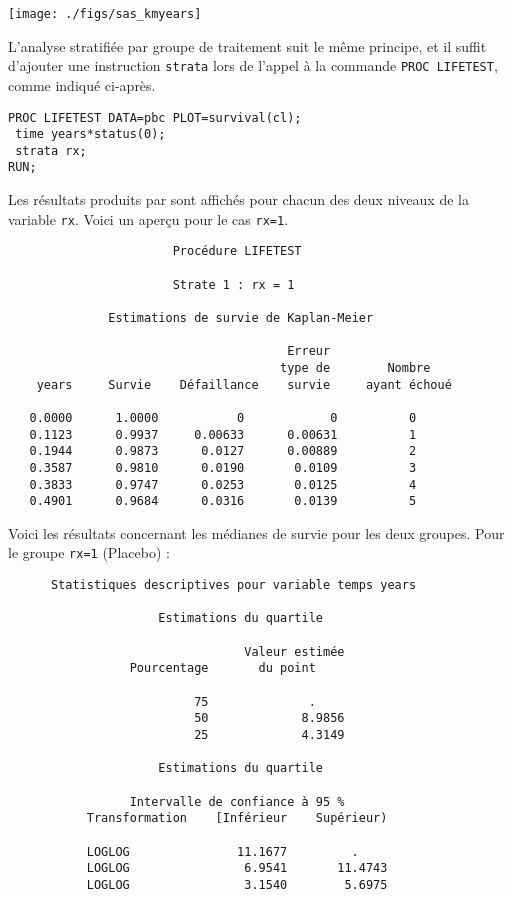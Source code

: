\texttt{[image: ./figs/sas\_kmyears]}

L'analyse stratifiée par groupe de traitement suit le même principe, et il
suffit d'ajouter une instruction \verb|strata| lors de l'appel à la commande
\verb|PROC LIFETEST|, comme indiqué ci-après.
\begin{verbatim}
PROC LIFETEST DATA=pbc PLOT=survival(cl);
 time years*status(0);
 strata rx;
RUN;
\end{verbatim}
Les résultats produits par \SAS sont affichés pour chacun des deux niveaux
de la variable \texttt{rx}. Voici un aperçu pour le cas \texttt{rx=1}.
\begin{verbatim}
                       Procédure LIFETEST

                       Strate 1 : rx = 1

              Estimations de survie de Kaplan-Meier

                                       Erreur
                                      type de        Nombre
    years     Survie    Défaillance    survie     ayant échoué

   0.0000      1.0000           0            0          0
   0.1123      0.9937     0.00633      0.00631          1
   0.1944      0.9873      0.0127      0.00889          2
   0.3587      0.9810      0.0190       0.0109          3
   0.3833      0.9747      0.0253       0.0125          4
   0.4901      0.9684      0.0316       0.0139          5
\end{verbatim}
Voici les résultats concernant les médianes de survie pour les deux
groupes. Pour le groupe \texttt{rx=1} (Placebo) :
\begin{verbatim}
      Statistiques descriptives pour variable temps years

                     Estimations du quartile

                                 Valeur estimée
                 Pourcentage       du point

                          75              .
                          50             8.9856
                          25             4.3149

                     Estimations du quartile

                 Intervalle de confiance à 95 %
           Transformation    [Inférieur    Supérieur)

           LOGLOG               11.1677         .
           LOGLOG                6.9541       11.4743
           LOGLOG                3.1540        5.6975
\end{verbatim}
